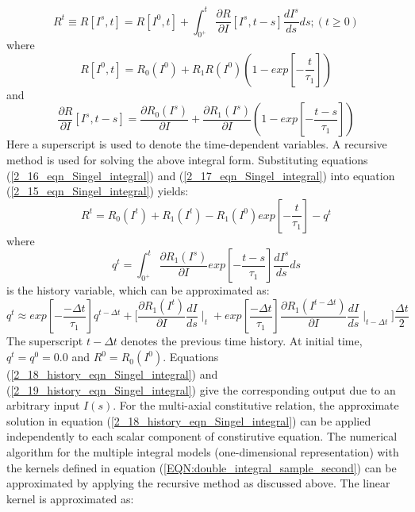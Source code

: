 \begin{equation}
R^t \equiv R[I^s,t]=R[I^0,t]+\int_{0^+}^{t} \frac{\partial R}{\partial I}[I^s,t-s] \frac{d I^s}{d s} ds 
; (t \geq 0)
\label{2_15_eqn_Singel_integral}
\end{equation}
where
\begin{equation}
R[I^0,t]=R_0(I^0)+R_1 R(I^0) \left(1-exp \left[-\frac{t}{\tau_1} \right] \right)
\label{2_16_eqn_Singel_integral}
\end{equation}
and
\begin{equation}
\frac{\partial R}{\partial I}[I^s,t-s]=\frac{\partial R_0(I^s)}{\partial I}+\frac{\partial R_1(I^s)}{\partial I}
\left(1-exp \left[-\frac{t-s}{\tau_1} \right] \right)
\label{2_17_eqn_Singel_integral}
\end{equation}
Here a superscript is used to denote the time-dependent variables. 
A recursive method is used for solving the above integral form. 
Substituting equations (\ref{2_16_eqn_Singel_integral}) and (\ref{2_17_eqn_Singel_integral}) into equation (\ref{2_15_eqn_Singel_integral}) yields:
\begin{equation}
R^t=R_0(I^t)+R_1(I^t)-R_1(I^0) exp \left[-\frac{t}{\tau_1} \right]-q^t
\label{2_18_history_eqn_Singel_integral}
\end{equation}
where
\begin{equation}
q^t=\int_{0^+}^{t} \frac{\partial R_1 (I^s) }{\partial I} exp \left[-\frac{t-s}{\tau_1} \right] \frac{d I^s}{d s} ds
\label{2_19_history_eqn_Singel_integral}
\end{equation}
is the history variable, which can be approximated as: 
\begin{equation}
q^t \approx  exp \left[-\frac{-\Delta t}{\tau_1} \right] q^{t-\Delta t}+ 
\Big[\frac{\partial R_1 (I^t) } {\partial I} \frac{d I}{d s} \mid_t
+exp \left[ \frac{-\Delta t}{\tau_1} \right]  
\frac{\partial R_1 (I^{t-\Delta t}) } {\partial I} \frac{d I}{d s} \mid_{t-\Delta t} \Big] \frac{\Delta t}{2}
\label{2_20_EQN:single_integral_history_variables}
\end{equation}
The superscript $t-\Delta t$ denotes the previous time history. 
At initial time, $q^t=q^0=0.0$ and $R^0=R_0(I^0)$. Equations (\ref{2_18_history_eqn_Singel_integral}) and (\ref{2_19_history_eqn_Singel_integral}) give the corresponding output due to an arbitrary input $I(s)$.
For the multi-axial constitutive relation, the approximate solution in equation (\ref{2_18_history_eqn_Singel_integral}) can be applied independently to each scalar component of constirutive equation.
The numerical algorithm for the multiple integral models (one-dimensional representation) with the kernels defined in equation (\ref{EQN:double_integral_sample_second}) can be approximated by applying the recursive method as discussed above. 
The linear kernel is approximated as:

